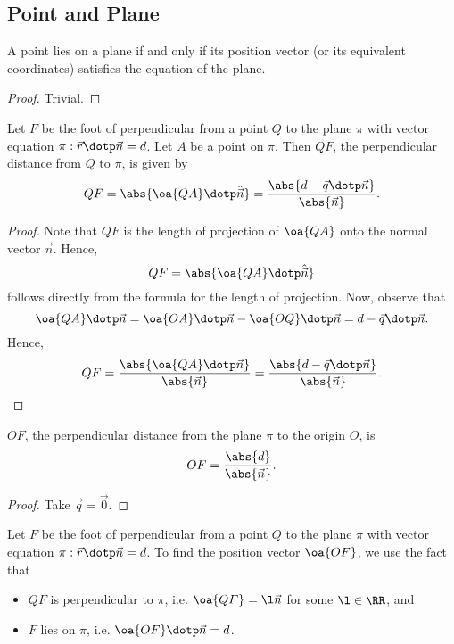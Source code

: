 \subsection{Point and Plane}

\begin{proposition}
    A point lies on a plane if and only if its position vector (or its equivalent coordinates) satisfies the equation of the plane.
\end{proposition}
\begin{proof}
    Trivial.
\end{proof}

\begin{proposition}
    Let $F$ be the foot of perpendicular from a point $Q$ to the plane $\pi$ with vector equation $\pi : \vec r \dotp \vec n = d$. Let $A$ be a point on $\pi$. Then $QF$, the perpendicular distance from $Q$ to $\pi$, is given by \[QF = \abs{\oa{QA} \dotp \hat{\vec n}} = \frac{\abs{d - \vec q \dotp \vec n}}{\abs{\vec n}}.\]
\end{proposition}
\begin{proof}
    Note that $QF$ is the length of projection of $\oa{QA}$ onto the normal vector $\vec n$. Hence, \[QF = \abs{\oa{QA} \dotp \hat{\vec n}}\] follows directly from the formula for the length of projection. Now, observe that \[\oa{QA} \dotp \vec n = \oa{OA} \dotp \vec n - \oa{OQ} \dotp \vec n = d - \vec q \dotp \vec n.\] Hence, \[QF = \frac{\abs{\oa{QA} \dotp \vec n}}{\abs{\vec n}} = \frac{\abs{d - \vec q \dotp \vec n}}{\abs{\vec n}}.\]
\end{proof}

\begin{corollary}
    $OF$, the perpendicular distance from the plane $\pi$ to the origin $O$, is \[OF = \frac{\abs{d}}{\abs{\vec n}}.\]
\end{corollary}
\begin{proof}
    Take $\vec q = \vec 0$.
\end{proof}

\begin{recipe}
    Let $F$ be the foot of perpendicular from a point $Q$ to the plane $\pi$ with vector equation $\pi : \vec r \dotp \vec n = d$. To find the position vector $\oa{OF}$, we use the fact that
    \begin{itemize}
        \item $QF$ is perpendicular to $\pi$, i.e. $\oa{QF} = \l \vec n$ for some $\l \in \RR$, and
        \item $F$ lies on $\pi$, i.e. $\oa{OF} \dotp \vec n = d$.
    \end{itemize}
\end{recipe}

